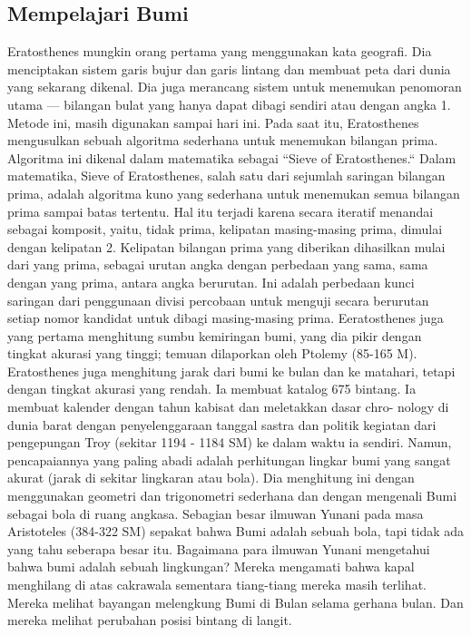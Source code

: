 \subsection{Mempelajari Bumi}
Eratosthenes mungkin orang pertama yang menggunakan kata geografi. Dia menciptakan sistem garis bujur dan garis lintang dan membuat peta dari dunia yang sekarang dikenal. Dia juga merancang sistem untuk menemukan penomoran utama — bilangan bulat yang hanya dapat dibagi sendiri atau dengan angka 1. Metode ini, masih digunakan sampai hari ini.
Pada saat itu, Eratosthenes mengusulkan sebuah algoritma sederhana untuk menemukan bilangan prima. Algoritma ini dikenal dalam matematika sebagai ``Sieve of Eratosthenes.``
Dalam matematika, Sieve of Eratosthenes, salah satu dari sejumlah saringan bilangan prima, adalah algoritma kuno yang sederhana untuk menemukan semua bilangan prima sampai batas tertentu. Hal itu terjadi karena secara iteratif menandai sebagai komposit, yaitu, tidak prima, kelipatan masing-masing prima, dimulai dengan kelipatan 2. Kelipatan bilangan prima yang diberikan dihasilkan mulai dari yang prima, sebagai urutan angka dengan perbedaan yang sama, sama dengan yang prima, antara angka berurutan. Ini adalah perbedaan kunci saringan dari penggunaan divisi percobaan untuk menguji secara berurutan setiap nomor kandidat untuk dibagi masing-masing prima.
Eeratosthenes juga yang pertama menghitung sumbu kemiringan bumi, yang dia pikir dengan tingkat akurasi yang tinggi; temuan dilaporkan oleh Ptolemy (85-165 M). Eratosthenes juga menghitung jarak dari bumi ke bulan dan ke matahari, tetapi dengan tingkat akurasi yang rendah. Ia membuat katalog 675 bintang. Ia membuat kalender dengan tahun kabisat dan meletakkan dasar chro- nology di dunia barat dengan penyelenggaraan tanggal sastra dan politik kegiatan dari pengepungan Troy (sekitar 1194 - 1184 SM) ke dalam waktu ia sendiri.
Namun, pencapaiannya yang paling abadi adalah perhitungan lingkar bumi yang sangat akurat (jarak di sekitar lingkaran atau bola). Dia menghitung ini dengan menggunakan geometri dan trigonometri sederhana dan dengan mengenali Bumi sebagai bola di ruang angkasa. Sebagian besar ilmuwan Yunani pada masa Aristoteles (384-322 SM) sepakat bahwa Bumi adalah sebuah bola, tapi tidak ada yang tahu seberapa besar itu.
Bagaimana para ilmuwan Yunani mengetahui bahwa bumi adalah sebuah lingkungan? Mereka mengamati bahwa kapal menghilang di atas cakrawala sementara tiang-tiang mereka masih terlihat. Mereka melihat bayangan melengkung Bumi di Bulan selama gerhana bulan. Dan mereka melihat perubahan posisi bintang di langit.
